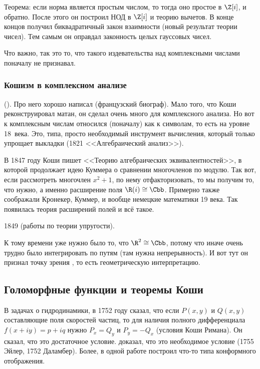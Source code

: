 \documentclass[a4paper,oneside,fleqn,10pt]{article}
\begin{document}
Теорема: если норма является простым числом, то тогда оно простое в
$\Z[i]$, и обратно.    После
этого он построил НОД в $\Z[i]$ и теорию вычетов. В конце концов
получил биквадратичный закон взаимности (новый результат теории
чисел).  Тем самым он оправдал законность целых гауссовых чисел.

Что важно, так это то, что  такого издевательства над
комплексными числами поначалу не признавал.

\subsubsection{Кошизм в комплексном анализе}

 ().  Про
него хорошо написал 
(французский биограф).  Мало того, что Коши реконструировал матан, он
сделал очень много для комплексного анализа. Но вот к комплексным
числам относился (поначалу) как к символам, то есть на уровне 18~века.
Это, типа, просто необходимый инструмент вычисления, который только
упрощает выкладки (1821 <<Алгебраический анализ>>).

В 1847 году Коши пишет <<Теорию алгебраических эквивалентностей>>, в
которой продолжает идею Куммера о сравнении многочленов по модулю.
Так вот, если рассмотреть многочлен $x^2+1$, по нему отфакторизовать,
то мы получим то, что нужно, а именно расширение поля $\R(i) \cong
\Cbb$.  Примерно также соображали Кронекер, Куммер, и вообще немецкие
математики 19 века. Так появилась теория расширений полей и всё такое.

1849  (работы по теории
упругости).

К тому времени  уже нужно было то, что $\R^2 \cong \Cbb$,
потому что иначе очень трудно было интегрировать по путям (там нужна
непрерывность).  И вот тут он признал точку зрения
, то есть геометрическую интерпретацию.

\subsection{Голоморфные функции и теоремы Коши}

В задачах о гидродинамики, в 1752 году  сказал, что
если $P(x,y)$ и $Q(x,y)$ составляющие поля скоростей частиц, то для
наличия полного дифференциала $f(x + iy) = p + i q$ нужно $P_x = Q_y$
и $P_y = -Q_x$ (условия Коши Римана).  Он сказал, что это достаточное
условие.  доказал, что это необходимое условие (1755
Эйлер, 1752 Даламбер).  Более, в одной работе  построил
что-то типа конформного отображения.
\end{document}
